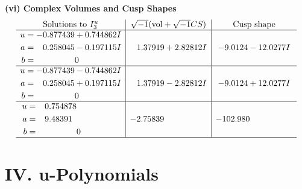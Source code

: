 \documentclass[1p]{elsarticle_modified}
\theoremstyle{definition}
\newcommand{\I}{\sqrt{-1}}
\begin{document}
\newpage\flushleft \textbf{(vi) Complex Volumes and Cusp Shapes}
$$\begin{array}{c|c|c}  
\text{Solutions to }I^u_{3}& \I (\text{vol} + \sqrt{-1}CS) & \text{Cusp shape}\\
 \hline 
\begin{aligned}
u &= -0.877439 + 0.744862 I \\
a &= \phantom{-}0.258045 - 0.197115 I \\
b &= \phantom{-0.000000 } 0\end{aligned}
 & \phantom{-}1.37919 + 2.82812 I & -9.0124 - 12.0277 I \\ \hline\begin{aligned}
u &= -0.877439 - 0.744862 I \\
a &= \phantom{-}0.258045 + 0.197115 I \\
b &= \phantom{-0.000000 } 0\end{aligned}
 & \phantom{-}1.37919 - 2.82812 I & -9.0124 + 12.0277 I \\ \hline\begin{aligned}
u &= \phantom{-}0.754878\phantom{ +0.000000I} \\
a &= \phantom{-}9.48391\phantom{ +0.000000I} \\
b &= \phantom{-0.000000 } 0\end{aligned}
 & -2.75839\phantom{ +0.000000I} & -102.980\phantom{ +0.000000I}\\
 \hline 
 \end{array}$$\newpage
\newpage\renewcommand{\arraystretch}{1}
\centering \section*{ IV. u-Polynomials}
\end{document}
